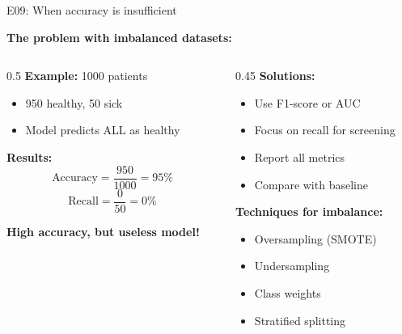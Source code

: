 \documentclass[aspectratio=169, 10pt]{beamer}
\begin{document}
\begin{frame}{E09: When accuracy is insufficient}
    
    \textbf{The problem with imbalanced datasets:}
    
    \vspace{3mm}
    
    \begin{columns}
        \begin{column}{0.5\textwidth}
            \textbf{Example:} 1000 patients
            \begin{itemize}
                \item 950 healthy, 50 sick
                \item Model predicts ALL as healthy
            \end{itemize}
            
            \vspace{3mm}
            
            \textbf{Results:}
            \[
            \text{Accuracy} = \frac{950}{1000} = 95\%
            \]
            \[
            \text{Recall} = \frac{0}{50} = 0\%
            \]
            
            \textbf{High accuracy, but useless model!}
        \end{column}
        
        \begin{column}{0.45\textwidth}
            \textbf{Solutions:}
            \begin{itemize}
                \item Use F1-score or AUC
                \item Focus on recall for screening
                \item Report all metrics
                \item Compare with baseline
            \end{itemize}
            
            \vspace{3mm}
            
            \textbf{Techniques for imbalance:}
            \begin{itemize}
                \item Oversampling (SMOTE)
                \item Undersampling
                \item Class weights
                \item Stratified splitting
            \end{itemize}
        \end{column}
    \end{columns}
    
\end{frame}
\end{document}
